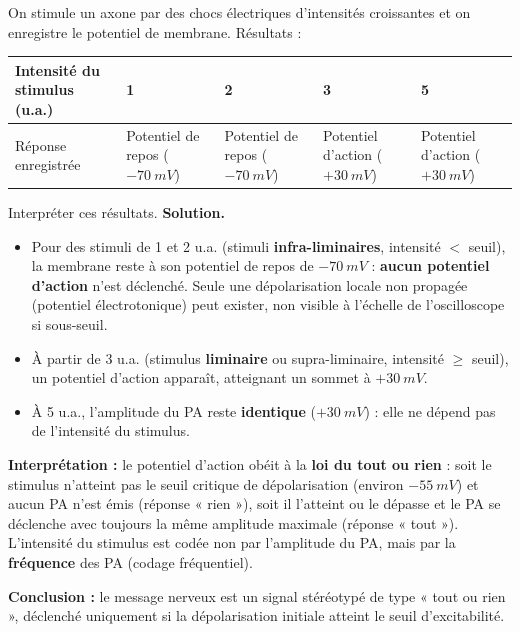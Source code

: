 \documentclass[11pt]{article}
\begin{document}
\begin{exoresolu}
On stimule un axone par des chocs électriques d'intensités croissantes et on enregistre le potentiel de membrane. Résultats :

\begin{center}
\begin{tabularx}{\linewidth}{|l|X|X|X|X|}\hline
\rowcolor{popblueL} Intensité du stimulus (u.a.) & 1 & 2 & 3 & 5 \\ \hline
Réponse enregistrée & Potentiel de repos ($-\SI{70}{mV}$) & Potentiel de repos ($-\SI{70}{mV}$) & Potentiel d'action ($+\SI{30}{mV}$) & Potentiel d'action ($+\SI{30}{mV}$) \\ \hline
\end{tabularx}
\end{center}

Interpréter ces résultats.
\tcblower
\textbf{Solution.}
\begin{itemize}
\item Pour des stimuli de 1 et 2 u.a. (stimuli \textbf{infra-liminaires}, intensité $<$ seuil), la membrane reste à son potentiel de repos de $-\SI{70}{mV}$ : \textbf{aucun potentiel d'action} n'est déclenché. Seule une dépolarisation locale non propagée (potentiel électrotonique) peut exister, non visible à l'échelle de l'oscilloscope si sous-seuil.
\item À partir de 3 u.a. (stimulus \textbf{liminaire} ou supra-liminaire, intensité $\ge$ seuil), un potentiel d'action apparaît, atteignant un sommet à $+\SI{30}{mV}$.
\item À 5 u.a., l'amplitude du PA reste \textbf{identique} ($+\SI{30}{mV}$) : elle ne dépend pas de l'intensité du stimulus.
\end{itemize}
\textbf{Interprétation :} le potentiel d'action obéit à la \textbf{loi du tout ou rien} : soit le stimulus n'atteint pas le seuil critique de dépolarisation (environ $-\SI{55}{mV}$) et aucun PA n'est émis (réponse « rien »), soit il l'atteint ou le dépasse et le PA se déclenche avec toujours la même amplitude maximale (réponse « tout »). L'intensité du stimulus est codée non par l'amplitude du PA, mais par la \textbf{fréquence} des PA (codage fréquentiel).

\textbf{Conclusion :} le message nerveux est un signal stéréotypé de type « tout ou rien », déclenché uniquement si la dépolarisation initiale atteint le seuil d'excitabilité.
\end{exoresolu}
\end{document}
